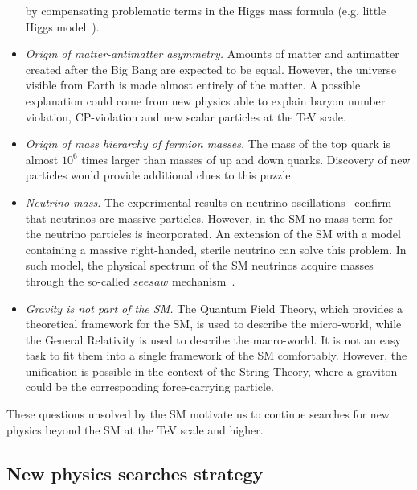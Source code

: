 \begin{itemize}
by compensating problematic terms in the Higgs mass formula (e.g. little Higgs model~\cite{Brak}).
\item \textit{Origin of matter-antimatter asymmetry.} Amounts of matter and antimatter created after the Big Bang are expected to be equal. However, the universe visible from Earth is made almost entirely of the matter.
A possible explanation could come from new physics able to explain baryon number violation, CP-violation and new scalar particles at the TeV scale.
\item \textit{Origin of mass hierarchy of fermion masses.} The mass of the top quark is almost $10^6$ times larger than masses of up and down quarks. Discovery of new particles would provide additional clues to this puzzle.
\item \textit{Neutrino mass.} The experimental results on neutrino oscillations~\cite{Fukuda:1998fd} confirm that neutrinos are massive particles. However, in the SM no mass term for the neutrino particles is incorporated. An extension of the SM with a model containing a massive right-handed, sterile neutrino can solve this problem. In such model, the physical spectrum of the SM neutrinos acquire masses through the so-called $seesaw$ mechanism~\cite{Mohapatra:1979ia}.
\item \textit{Gravity is not part of the SM.} The Quantum Field Theory, which provides a theoretical framework for the SM, is used to describe the micro-world, while the General Relativity is used to describe the macro-world. It is not an easy task to fit them into a single framework of the SM comfortably. However, the unification is possible in the context of the String Theory, where a graviton could be the corresponding force-carrying particle.
\end{itemize}


These questions unsolved by the SM motivate us to continue searches for new physics beyond the SM at the TeV scale and higher.

\subsection{New physics searches strategy}

